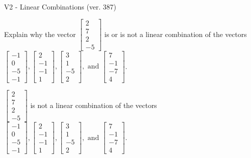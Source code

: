 \begin{exercise}
  \begin{exerciseTitle}V2 - Linear Combinations (ver. 387)\end{exerciseTitle}
  \begin{exerciseStatement}
    Explain why the vector \(\left[\begin{array}{c}
2 \\
7 \\
2 \\
-5
\end{array}\right]\)  is or is not a linear 
	combination of the vectors \(\left[\begin{array}{c}
-1 \\
0 \\
-5 \\
-1
\end{array}\right] , \left[\begin{array}{c}
2 \\
-1 \\
-1 \\
1
\end{array}\right] , \left[\begin{array}{c}
3 \\
1 \\
-5 \\
2
\end{array}\right] , \text{ and } \left[\begin{array}{c}
7 \\
-1 \\
-7 \\
4
\end{array}\right]\).
	


  \end{exerciseStatement}
  \begin{exerciseAnswer}
   \(\left[\begin{array}{c}
2 \\
7 \\
2 \\
-5
\end{array}\right]\) 
  	 is not  
	a linear combination of the vectors \(\left[\begin{array}{c}
-1 \\
0 \\
-5 \\
-1
\end{array}\right] , \left[\begin{array}{c}
2 \\
-1 \\
-1 \\
1
\end{array}\right] , \left[\begin{array}{c}
3 \\
1 \\
-5 \\
2
\end{array}\right] , \text{ and } \left[\begin{array}{c}
7 \\
-1 \\
-7 \\
4
\end{array}\right]\).


\end{exerciseAnswer}
\end{exercise}
